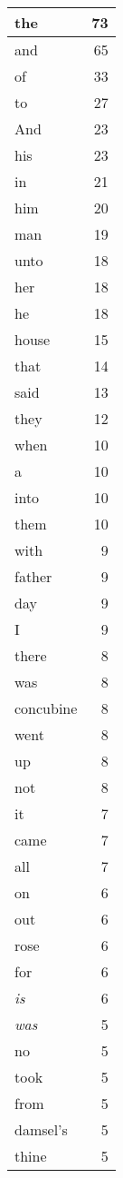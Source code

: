 \begin{center}
\begin{longtable}{l|r}
\hline \hline
\endlastfoot
the & 73 \\ \hline
and & 65 \\ \hline
of & 33 \\ \hline
to & 27 \\ \hline
And & 23 \\ \hline
his & 23 \\ \hline
in & 21 \\ \hline
him & 20 \\ \hline
man & 19 \\ \hline
unto & 18 \\ \hline
her & 18 \\ \hline
he & 18 \\ \hline
house & 15 \\ \hline
that & 14 \\ \hline
said & 13 \\ \hline
they & 12 \\ \hline
when & 10 \\ \hline
a & 10 \\ \hline
into & 10 \\ \hline
them & 10 \\ \hline
with & 9 \\ \hline
father & 9 \\ \hline
day & 9 \\ \hline
I & 9 \\ \hline
there & 8 \\ \hline
was & 8 \\ \hline
concubine & 8 \\ \hline
went & 8 \\ \hline
up & 8 \\ \hline
not & 8 \\ \hline
it & 7 \\ \hline
came & 7 \\ \hline
all & 7 \\ \hline
on & 6 \\ \hline
out & 6 \\ \hline
rose & 6 \\ \hline
for & 6 \\ \hline
\emph{is} & 6 \\ \hline
\emph{was} & 5 \\ \hline
no & 5 \\ \hline
took & 5 \\ \hline
from & 5 \\ \hline
damsel's & 5 \\ \hline
thine & 5 \\ \hline

\end{longtable}
\end{center}
